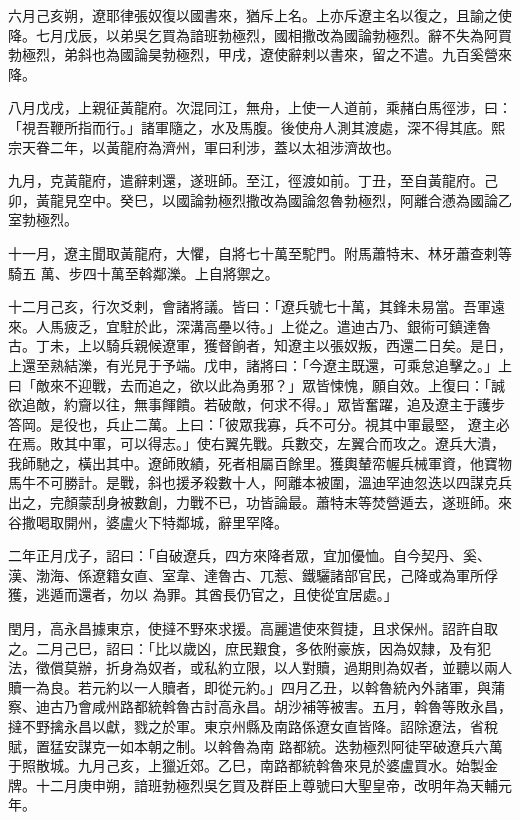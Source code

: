 \begin{pinyinscope}
 六月己亥朔，遼耶律張奴復以國書來，猶斥上名。上亦斥遼主名以復之，且諭之使降。七月戊辰，以弟吳乞買為諳班勃極烈，國相撒改為國論勃極烈。辭不失為阿買
 勃極烈，弟斜也為國論昊勃極烈，甲戌，遼使辭剌以書來，留之不遣。九百奚營來降。



 八月戊戌，上親征黃龍府。次混同江，無舟，上使一人道前，乘赭白馬徑涉，曰：「視吾鞭所指而行。」諸軍隨之，水及馬腹。後使舟人測其渡處，深不得其底。熙宗天眷二年，以黃龍府為濟州，軍曰利涉，蓋以太祖涉濟故也。



 九月，克黃龍府，遣辭剌還，遂班師。至江，徑渡如前。丁丑，至自黃龍府。己卯，黃龍見空中。癸巳，以國論勃極烈撒改為國論忽魯勃極烈，阿離合懣為國論乙室勃極烈。



 十一月，遼主聞取黃龍府，大懼，自將七十萬至駝門。附馬蕭特末、林牙蕭查剌等騎五
 萬、步四十萬至斡鄰濼。上自將禦之。



 十二月己亥，行次爻剌，會諸將議。皆曰：「遼兵號七十萬，其鋒未易當。吾軍遠來。人馬疲乏，宜駐於此，深溝高壘以待。」上從之。遣迪古乃、銀術可鎮達魯古。丁未，上以騎兵親候遼軍，獲督餉者，知遼主以張奴叛，西還二日矣。是日，上還至熟結濼，有光見于予端。戊申，諸將曰：「今遼主既還，可乘怠追擊之。」上曰「敵來不迎戰，去而追之，欲以此為勇邪？」眾皆悚愧，願自效。上復曰：「誠欲追敵，約齎以往，無事餫饋。若破敵，何求不得。」眾皆奮躍，追及遼主于護步答岡。是役也，兵止二萬。上曰：「彼眾我寡，兵不可分。視其中軍最堅，
 遼主必在焉。敗其中軍，可以得志。」使右翼先戰。兵數交，左翼合而攻之。遼兵大潰，我師馳之，橫出其中。遼師敗績，死者相屬百餘里。獲輿輦帟幄兵械軍資，他寶物馬牛不可勝計。是戰，斜也援矛殺數十人，阿離本被圍，溫迪罕迪忽迭以四謀克兵出之，完顏蒙刮身被數創，力戰不已，功皆論最。蕭特末等焚營遁去，遂班師。來谷撒喝取開州，婆盧火下特鄰城，辭里罕降。



 二年正月戊子，詔曰：「自破遼兵，四方來降者眾，宜加優恤。自今契丹、奚、漢、渤海、係遼籍女直、室韋、達魯古、兀惹、鐵驪諸部官民，己降或為軍所俘獲，逃遁而還者，勿以
 為罪。其酋長仍官之，且使從宜居處。」



 閏月，高永昌據東京，使撻不野來求援。高麗遣使來賀捷，且求保州。詔許自取之。二月己巳，詔曰：「比以歲凶，庶民艱食，多依附豪族，因為奴隸，及有犯法，徵償莫辦，折身為奴者，或私約立限，以人對贖，過期則為奴者，並聽以兩人贖一為良。若元約以一人贖者，即從元約。」四月乙丑，以斡魯統內外諸軍，與蒲察、迪古乃會咸州路都統斡魯古討高永昌。胡沙補等被害。五月，斡魯等敗永昌，撻不野擒永昌以獻，戮之於軍。東京州縣及南路係遼女直皆降。詔除遼法，省稅賦，置猛安謀克一如本朝之制。以斡魯為南
 路都統。迭勃極烈阿徒罕破遼兵六萬于照散城。九月己亥，上獵近郊。乙巳，南路都統斡魯來見於婆盧買水。始製金牌。十二月庚申朔，諳班勃極烈吳乞買及群臣上尊號曰大聖皇帝，改明年為天輔元年。




\end{pinyinscope}
